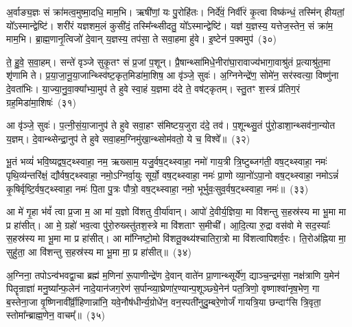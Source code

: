 {\anuvakamend[{गृ॒ह्ण॒न्ति॒ दि॒वा॒की॒र्त्ये॑नै॒वोभ॒यतो॒ नाप्र॑तिष्ठिता॒ आस॑त॒ एक॑विꣳशतिश्च}]}%

अ॒र्वाङ्य॒ज्ञः सं क्रा॑मत्व॒मुष्मा॒दधि॒ माम॒भि। ऋषी॑णां॒ यः पु॒रोहि॑तः। निर्दे॑वं॒ निर्वी॑रं कृ॒त्वा विष्क॑न्धं॒ तस्मि॑न् हीयतां॒ यो᳚\-ऽस्मान्द्वेष्टि॑। शरी॑रं यज्ञशम॒लं कुसी॑दं॒ तस्मि᳚न्थ्सीदतु॒ यो᳚\-ऽस्मान्द्वेष्टि॑। यज्ञ॑ य॒ज्ञस्य॒ यत्तेज॒स्तेन॒ सं क्रा॑म॒ माम॒भि। ब्रा॒ह्म॒णानृ॒त्विजो॑ दे॒वान् य॒ज्ञस्य॒ तप॑सा॒ ते सवा॒हमा हु॑वे। इ॒ष्टेन॑ प॒क्वमुप॑~(३०)\ip

ते॒ हु॒वे॒ स॒वा॒हम्। सन्ते॑ वृञ्जे सुकृ॒तꣳ सं प्र॒जां प॒शून्। प्रै॒षान्थ्सा॑मिधे॒नीरा॑घा॒रावाज्य॑भागा॒वाश्रु॑तं प्र॒त्याश्रु॑त॒मा शृ॑णामि ते। प्र॒या॒जा॒नू॒या॒जान्थ्स्वि॑ष्ट॒कृत॒मिडा॑मा॒शिष॒ आ वृ॑ञ्जे॒ सुवः॑। अ॒ग्निनेन्द्रे॑ण॒ सोमे॑न॒ सर॑स्वत्या॒ विष्णु॑ना दे॒वता॑भिः। या॒ज्या॒नु॒वा॒क्या᳚भ्या॒मुप॑ ते हुवे स्वा॒हं य॒ज्ञमा द॑दे ते॒ वष॑ट्कृतम्। स्तु॒तꣳ श॒स्त्रं प्र॑तिग॒रं ग्रह॒मिडा॑मा॒शिषः॑~(३१)\ip

आ वृ॑ञ्जे॒ सुवः॑। प॒त्नी॒सं॒या॒जानुप॑ ते हुवे सवा॒हꣳ स॑मिष्टय॒जुरा द॑दे॒ तव॑। प॒शून्थ्सु॒तं पु॑रो॒डाशा॒न्थ्सव॑ना॒न्योत य॒ज्ञम्। दे॒वान्थ्सेन्द्रा॒नुप॑ ते हुवे सवा॒हम॒ग्निमु॑खा॒न्थ्सोम॑वतो॒ ये च॒ विश्वे᳚॥~(३२)\ip

{\anuvakamend[{उप॒ ग्रह॒मिडा॑मा॒शिषो॒ द्वात्रिꣳ॑शच्च}]}%

भू॒तं भव्यं॑ भवि॒ष्यद्वष॒ट्थ्\-स्वाहा॒ नम॒ ऋख्साम॒ यजु॒र्वष॒ट्थ्\-स्वाहा॒ नमो॑ गाय॒त्री त्रि॒ष्टुब्जग॑ती॒ वष॒ट्थ्\-स्वाहा॒ नमः॑ पृथि॒व्य॑न्तरि॑क्षं॒ द्यौर्वष॒ट्थ्\-स्वाहा॒ नमो॒\-ऽग्निर्वा॒युः सूर्यो॒ वष॒ट्थ्\-स्वाहा॒ नमः॑ प्रा॒णो व्या॒नो॑\-ऽपा॒नो वष॒ट्थ्\-स्वाहा॒ नमो\-ऽन्नं॑ कृ॒षिर्वृष्टि॒र्वष॒ट्थ्\-स्वाहा॒ नमः॑ पि॒ता पु॒त्रः पौत्रो॒ वष॒ट्थ्\-स्वाहा॒ नमो॒ भूर्भुवः॒सुव॒र्वष॒ट्थ्\-स्वाहा॒ नमः॑॥~(३३)\ip

{\anuvakamend[{भुव॑श्च॒त्वारि॑ च}]}%

आ मे॑ गृ॒हा भ॑वं᳚ त्वा प्र॒जा म॒ आ मा॑ य॒ज्ञो वि॑शतु वी॒र्या॑वान्। आपो॑ दे॒वीर्य॒ज्ञिया॒ मा वि॑शन्तु स॒हस्र॑स्य मा भू॒मा मा प्र हा॑सीत्। आ मे॒ ग्रहो॑ भव॒त्वा पु॑रो॒रुख्स्तु॑तश॒स्त्रे मा वि॑शताꣳ स॒मीची᳚। आ॒दि॒त्या रु॒द्रा वस॑वो मे सद॒स्याः᳚ स॒हस्र॑स्य मा भू॒मा मा प्र हा॑सीत्। आ मा᳚ग्निष्टो॒मो वि॑शतू॒क्थ्य॑श्चातिरा॒त्रो मा वि॑शत्वापिशर्व॒रः। ति॒रोअ॑ह्निया मा॒ सुहु॑ता॒ आ वि॑शन्तु स॒हस्र॑स्य मा भू॒मा मा॒ प्र हा॑सीत्॥~(३४)\ip

{\anuvakamend[{अ॒ग्नि॒ष्टो॒मो वि॑शत्व॒ष्टाद॑श च}]}%

अ॒ग्निना॒ तपो\-ऽन्व॑भवद्वा॒चा ब्रह्म॑ म॒णिना॑ रू॒पाणीन्द्रे॑ण दे॒वान् वाते॑न प्रा॒णान्थ्सूर्ये॑ण॒ द्याञ्च॒न्द्रम॑सा॒ नक्ष॑त्राणि य॒मेन॑ पितॄन्राज्ञा॑ मनु॒ष्या᳚न्फ॒लेन॑ नादे॒यान॑जग॒रेण॑ स॒र्पान्व्या॒घ्रेणा॑र॒ण्यान्प॒शूञ्छ्ये॒नेन॑ पत॒त्रिणो॒ वृष्णाश्वा॑नृष॒भेण॒ गा ब॒स्तेना॒जा वृ॒ष्णिनावी᳚र्व्री॒हिणान्ना॑नि॒ यवे॒नौष॑धीर्न्य॒ग्रोधे॑न॒ वन॒स्पती॑नुदु॒म्बरे॒णोर्जं॑ गायत्रि॒या छन्दाꣳ॑सि त्रि॒वृता॒ स्तोमा᳚न्ब्राह्म॒णेन॒ वाचम्᳚॥~(३५)\ip

